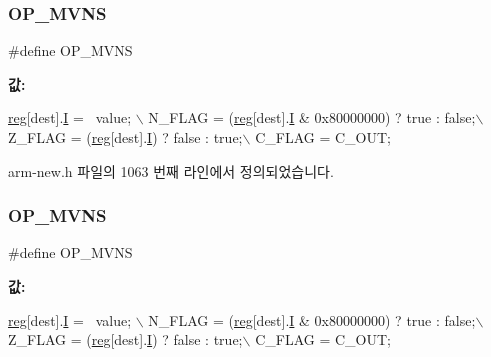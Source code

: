 \mbox{\label{arm-new_8h_a270f1afdc09887a7da5dcaa6c52004c1}} 
\subsubsection{\texorpdfstring{O\+P\+\_\+\+M\+V\+NS}{OP\_MVNS}\hspace{0.1cm}{\footnotesize\ttfamily [1/2]}}
{\footnotesize\ttfamily \#define O\+P\+\_\+\+M\+V\+NS}

{\bfseries 값\+:}
\begin{DoxyCode}
\mbox{\hyperlink{_g_b_a_8h_ae29faba89509024ffd1a292badcedf2d}{reg}}[dest].\mbox{\hyperlink{unionreg__pair_a9f6a42d56c07829d7013571eda998252}{I}} = ~value; \(\backslash\)
    N\_FLAG = (\mbox{\hyperlink{_g_b_a_8h_ae29faba89509024ffd1a292badcedf2d}{reg}}[dest].\mbox{\hyperlink{unionreg__pair_a9f6a42d56c07829d7013571eda998252}{I}} & 0x80000000) ? \textcolor{keyword}{true} : \textcolor{keyword}{false};\(\backslash\)
    Z\_FLAG = (\mbox{\hyperlink{_g_b_a_8h_ae29faba89509024ffd1a292badcedf2d}{reg}}[dest].\mbox{\hyperlink{unionreg__pair_a9f6a42d56c07829d7013571eda998252}{I}}) ? \textcolor{keyword}{false} : \textcolor{keyword}{true};\(\backslash\)
    C\_FLAG = C\_OUT;
\end{DoxyCode}


arm-\/new.\+h 파일의 1063 번째 라인에서 정의되었습니다.

\mbox{\label{_g_b_a_8cpp_a270f1afdc09887a7da5dcaa6c52004c1}} 
\subsubsection{\texorpdfstring{O\+P\+\_\+\+M\+V\+NS}{OP\_MVNS}\hspace{0.1cm}{\footnotesize\ttfamily [2/2]}}
{\footnotesize\ttfamily \#define O\+P\+\_\+\+M\+V\+NS}

{\bfseries 값\+:}
\begin{DoxyCode}
\mbox{\hyperlink{_g_b_a_8h_ae29faba89509024ffd1a292badcedf2d}{reg}}[dest].\mbox{\hyperlink{unionreg__pair_a9f6a42d56c07829d7013571eda998252}{I}} = ~value; \(\backslash\)
    N\_FLAG = (\mbox{\hyperlink{_g_b_a_8h_ae29faba89509024ffd1a292badcedf2d}{reg}}[dest].\mbox{\hyperlink{unionreg__pair_a9f6a42d56c07829d7013571eda998252}{I}} & 0x80000000) ? \textcolor{keyword}{true} : \textcolor{keyword}{false};\(\backslash\)
    Z\_FLAG = (\mbox{\hyperlink{_g_b_a_8h_ae29faba89509024ffd1a292badcedf2d}{reg}}[dest].\mbox{\hyperlink{unionreg__pair_a9f6a42d56c07829d7013571eda998252}{I}}) ? \textcolor{keyword}{false} : \textcolor{keyword}{true};\(\backslash\)
    C\_FLAG = C\_OUT;
\end{DoxyCode}
\mbox{\label{arm-new_8h_adf903b1d05958a7b412adfc804bea1cd}} 
